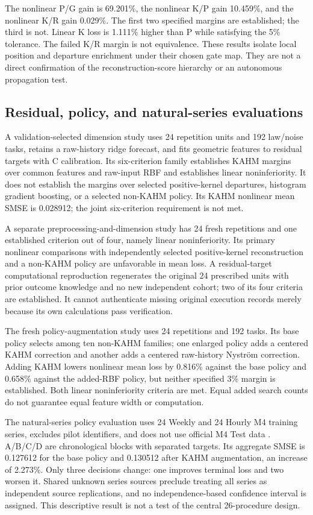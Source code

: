 The nonlinear P/G gain is 69.201\%, the nonlinear K/P gain 10.459\%, and the nonlinear K/R gain 0.029\%. The first two specified margins are established; the third is not. Linear K loss is 1.111\% higher than P while satisfying the 5\% tolerance. The failed K/R margin is not equivalence. These results isolate local position and departure enrichment under their chosen gate map. They are not a direct confirmation of the reconstruction-score hierarchy or an autonomous propagation test.

\subsection{Residual, policy, and natural-series evaluations}
A validation-selected dimension study uses 24 repetition units and 192 law/noise tasks, retains a raw-history ridge forecast, and fits geometric features to residual targets with C calibration. Its six-criterion family establishes KAHM margins over common features and raw-input RBF and establishes linear noninferiority. It does not establish the margins over selected positive-kernel departures, histogram gradient boosting, or a selected non-KAHM policy. Its KAHM nonlinear mean SMSE is 0.028912; the joint six-criterion requirement is not met.

A separate preprocessing-and-dimension study has 24 fresh repetitions and one established criterion out of four, namely linear noninferiority. Its primary nonlinear comparisons with independently selected positive-kernel reconstruction and a non-KAHM policy are unfavorable in mean loss. A residual-target computational reproduction regenerates the original 24 prescribed units with prior outcome knowledge and no new independent cohort; two of its four criteria are established. It cannot authenticate missing original execution records merely because its own calculations pass verification.

The fresh policy-augmentation study uses 24 repetitions and 192 tasks. Its base policy selects among ten non-KAHM families; one enlarged policy adds a centered KAHM correction and another adds a centered raw-history Nystr\"om correction. Adding KAHM lowers nonlinear mean loss by 0.816\% against the base policy and 0.658\% against the added-RBF policy, but neither specified 3\% margin is established. Both linear noninferiority criteria are met. Equal added search counts do not guarantee equal feature width or computation.

The natural-series policy evaluation uses 24 Weekly and 24 Hourly M4 training series, excludes pilot identifiers, and does not use official M4 Test data \citep{M4DataSnapshot2026}. A/B/C/D are chronological blocks with separated targets. Its aggregate SMSE is 0.127612 for the base policy and 0.130512 after KAHM augmentation, an increase of 2.273\%. Only three decisions change: one improves terminal loss and two worsen it. Shared unknown series sources preclude treating all series as independent source replications, and no independence-based confidence interval is assigned. This descriptive result is not a test of the central 26-procedure design.

